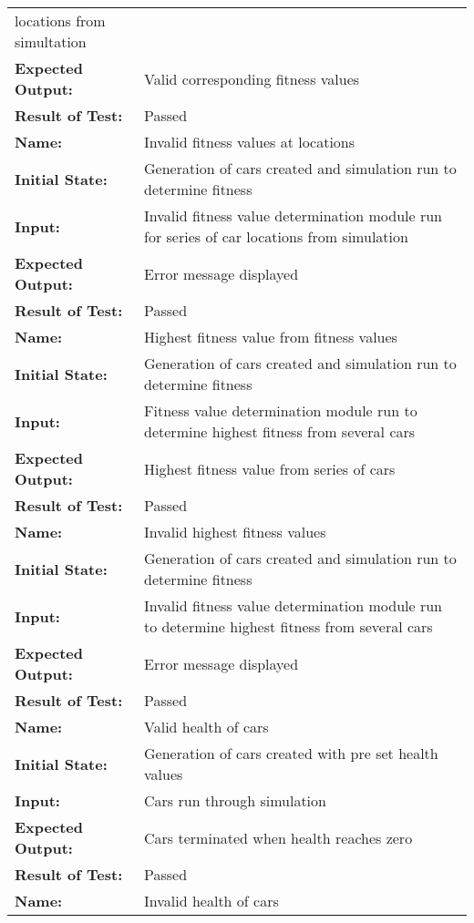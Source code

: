 \documentclass[12pt, titlepage]{article}
\begin{document}
\begin{center}
\begin{longtable}{ l | p{10cm} }
locations from simultation\\
\textbf{Expected Output:} & Valid corresponding fitness values\\[0.6em]
\textbf{Result of Test:} & Passed\\
\hline
\rule{0pt}{1.5em}\textbf{Name:} & Invalid fitness values at locations\\
\textbf{Initial State:} & Generation of cars created and simulation run to 
determine fitness\\
\textbf{Input:} & Invalid fitness value determination module run for series of 
car locations from simulation\\
\textbf{Expected Output:} & Error message displayed\\[0.6em]
\textbf{Result of Test:} & Passed\\
\hline
\rule{0pt}{1.5em}\textbf{Name:} & Highest fitness value from fitness values\\
\textbf{Initial State:} & Generation of cars created and simulation run to 
determine fitness\\
\textbf{Input:} & Fitness value determination module run to determine highest 
fitness from several cars\\
\textbf{Expected Output:} & Highest fitness value from series of cars\\[0.6em]
\textbf{Result of Test:} & Passed\\
\hline
\rule{0pt}{1.5em}\textbf{Name:} & Invalid highest fitness values\\
\textbf{Initial State:} & Generation of cars created and simulation run to 
determine fitness\\
\textbf{Input:} & Invalid fitness value determination module run to determine 
highest fitness from several cars\\
\textbf{Expected Output:} & Error message displayed\\[0.6em]
\textbf{Result of Test:} & Passed\\
\hline
\rule{0pt}{1.5em}\textbf{Name:} & Valid health of cars\\
\textbf{Initial State:} & Generation of cars created with pre set health 
values\\
\textbf{Input:} & Cars run through simulation\\
\textbf{Expected Output:} & Cars terminated when health reaches zero\\[0.6em]
\textbf{Result of Test:} & Passed\\
\hline
\rule{0pt}{1.5em}\textbf{Name:} & Invalid health of cars\\

\end{longtable}
\end{center}
\end{document}
